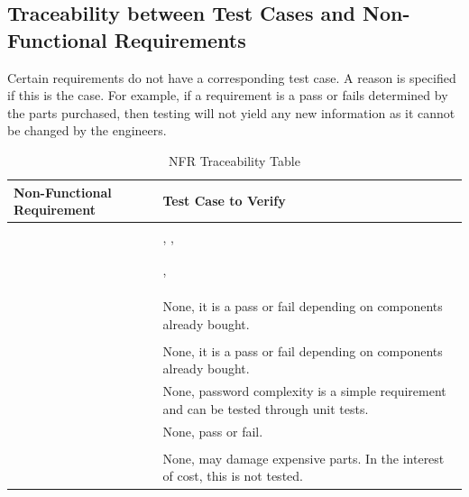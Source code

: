 \documentclass[12pt, titlepage]{article}
\begin{document}
\clearpage


\subsection{Traceability between Test Cases and Non-Functional Requirements}

Certain requirements do not have a corresponding test case. A reason is specified if this is the case. For example, if a requirement is a pass or fails determined by the parts purchased, then testing will not yield any new information as it cannot be changed by the engineers. 

\begin{table}[!h]
\begin{center}
\caption {NFR Traceability Table}
\label{tab:NFR_Trace}
\begin{tabular}{ | m{3cm} | m{12cm} | } 
\hline
Non-Functional Requirement & Test Case to Verify \\
\hline
\nameref{PERF_001} & \nameref{tab:STC_013} \\ \hline
\nameref{PERF_002} & \nameref{tab:STC_001}, \nameref{tab:STC_002}, \nameref{tab:STC_003} \\ \hline
\nameref{PERF_003} & \nameref{tab:STC_004} \\ \hline
\nameref{PERF_004} &  \nameref{tab:STC_013} \\ \hline
\nameref{PERF_005} & \nameref{tab:STC_002}, \nameref{tab:STC_003} \\ \hline
\nameref{PERF_006} & \nameref{tab:STC_004} \\ \hline
\nameref{PERF_007} & \nameref{tab:STC_015} \\ \hline
\nameref{PERF_008} & \nameref{tab:STC_004} \\ \hline
\nameref{DES_001} & None, it is a pass or fail depending on components already bought. \\ \hline
\nameref{STD_001} & \nameref{tab:STC_019} \\ \hline
\nameref{STD_002} & None, it is a pass or fail depending on components already bought. \\ \hline
\nameref{SEC_001} & None, password complexity is a simple requirement and can be tested through unit tests.\\ \hline
\nameref{SEC_002} & None, pass or fail. \\ \hline
\nameref{MTNC_001} & \nameref{tab:STC_020} \\ \hline
\nameref{MTNC_002} & None, may damage expensive parts. In the interest of cost, this is not tested. \\ \hline

\end{tabular}
\end{center}
\end{table}
\end{document}
